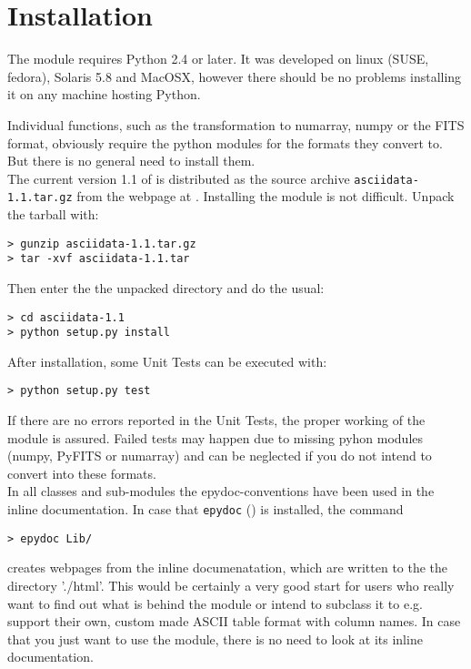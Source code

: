 \section{Installation}
\label{installation}
The \AAD module requires Python 2.4 or later. It was developed on linux
(SUSE,
fedora), Solaris 5.8 and
MacOSX, however there should be no problems installing it on any machine
hosting Python.

Individual functions, such as the transformation to numarray,
numpy or the FITS format, obviously require the python
modules for the formats they convert to. But there is no general need to install them.\\

The current version 1.1 of \AAD is distributed as the source
archive {\tt asciidata-1.1.tar.gz} from the \AAD webpage
 at\newline
{}.
Installing the module is not difficult. Unpack the tarball with:
\begin{verbatim}
> gunzip asciidata-1.1.tar.gz
> tar -xvf asciidata-1.1.tar
\end{verbatim}

Then enter the the unpacked directory and do the usual:
\begin{verbatim}
> cd asciidata-1.1
> python setup.py install
\end{verbatim}

After installation, some Unit Tests can be executed with:
\begin{verbatim}
> python setup.py test
\end{verbatim}
If there are no errors reported in the Unit Tests, the proper
working  of the module is assured. Failed tests may happen due to
missing pyhon modules (numpy, PyFITS or numarray) and can be neglected
if you do not intend to convert into these formats.\\

In all classes and sub-modules the epydoc-conventions have been used in
the inline documentation. In case that {\tt epydoc}
()
is installed, the command
\begin{verbatim}
> epydoc Lib/
\end{verbatim}
creates webpages from the inline documenatation, which are written to the
the directory './html'. This would be certainly a very good start for users
who really want to find out what is behind the module or intend to subclass
it to e.g. support their own, custom made ASCII table format with column
names. In case that you just want to use the \AAD module, there is no
need to look at its inline documentation.

